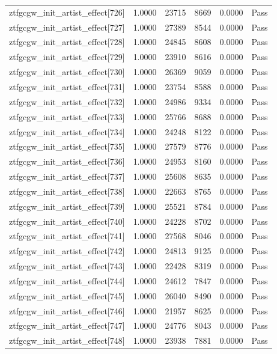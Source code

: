\begin{table}[htbp]
\begin{tabular}{llrrll}
ztfgcgw\_init\_artist\_effect[726] & 1.0000 & 23715 & 8669 & 0.0000 & Pass \\
ztfgcgw\_init\_artist\_effect[727] & 1.0000 & 27389 & 8544 & 0.0000 & Pass \\
ztfgcgw\_init\_artist\_effect[728] & 1.0000 & 24845 & 8608 & 0.0000 & Pass \\
ztfgcgw\_init\_artist\_effect[729] & 1.0000 & 23910 & 8616 & 0.0000 & Pass \\
ztfgcgw\_init\_artist\_effect[730] & 1.0000 & 26369 & 9059 & 0.0000 & Pass \\
ztfgcgw\_init\_artist\_effect[731] & 1.0000 & 23754 & 8588 & 0.0000 & Pass \\
ztfgcgw\_init\_artist\_effect[732] & 1.0000 & 24986 & 9334 & 0.0000 & Pass \\
ztfgcgw\_init\_artist\_effect[733] & 1.0000 & 25766 & 8688 & 0.0000 & Pass \\
ztfgcgw\_init\_artist\_effect[734] & 1.0000 & 24248 & 8122 & 0.0000 & Pass \\
ztfgcgw\_init\_artist\_effect[735] & 1.0000 & 27579 & 8776 & 0.0000 & Pass \\
ztfgcgw\_init\_artist\_effect[736] & 1.0000 & 24953 & 8160 & 0.0000 & Pass \\
ztfgcgw\_init\_artist\_effect[737] & 1.0000 & 25608 & 8635 & 0.0000 & Pass \\
ztfgcgw\_init\_artist\_effect[738] & 1.0000 & 22663 & 8765 & 0.0000 & Pass \\
ztfgcgw\_init\_artist\_effect[739] & 1.0000 & 25521 & 8784 & 0.0000 & Pass \\
ztfgcgw\_init\_artist\_effect[740] & 1.0000 & 24228 & 8702 & 0.0000 & Pass \\
ztfgcgw\_init\_artist\_effect[741] & 1.0000 & 27568 & 8046 & 0.0000 & Pass \\
ztfgcgw\_init\_artist\_effect[742] & 1.0000 & 24813 & 9125 & 0.0000 & Pass \\
ztfgcgw\_init\_artist\_effect[743] & 1.0000 & 22428 & 8319 & 0.0000 & Pass \\
ztfgcgw\_init\_artist\_effect[744] & 1.0000 & 24612 & 7847 & 0.0000 & Pass \\
ztfgcgw\_init\_artist\_effect[745] & 1.0000 & 26040 & 8490 & 0.0000 & Pass \\
ztfgcgw\_init\_artist\_effect[746] & 1.0000 & 21957 & 8625 & 0.0000 & Pass \\
ztfgcgw\_init\_artist\_effect[747] & 1.0000 & 24776 & 8043 & 0.0000 & Pass \\
ztfgcgw\_init\_artist\_effect[748] & 1.0000 & 23938 & 7881 & 0.0000 & Pass \\

\end{tabular}
\end{table}
